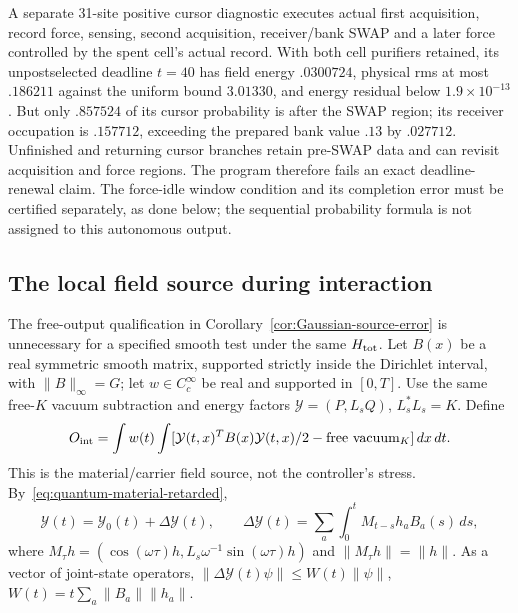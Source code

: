 A separate 31-site positive cursor diagnostic executes actual first
acquisition, record force, sensing, second acquisition, receiver/bank
SWAP and a later force controlled by the spent cell's actual record.
With both cell purifiers retained, its unpostselected deadline $t=40$
has field energy $.0300724$, physical rms at most $.186211$ against
the uniform bound $3.01330$, and energy residual below
$1.9\times10^{-13}$. But only $.857524$ of its cursor probability
is after the SWAP region; its receiver occupation is $.157712$, exceeding
the prepared bank value $.13$ by $.027712$. Unfinished and returning cursor branches
retain pre-SWAP data and can revisit acquisition and force regions.
The program therefore fails an exact deadline-renewal claim.
The force-idle window condition and its completion error must be
certified separately, as done below; the sequential probability formula
is not assigned to this autonomous output.

\subsection{The local field source during interaction}
\label{sec:interacting-material-source}

The free-output qualification in
Corollary~\ref{cor:Gaussian-source-error} is unnecessary for a
specified smooth test under the same $H_{\rm tot}$.
Let $B(x)$ be a real symmetric smooth matrix, supported strictly inside
the Dirichlet interval, with $\|B\|_\infty=G$; let
$w\in C_c^\infty$ be real and supported in $[0,T]$.
Use the same free-$K$ vacuum subtraction and energy factors
$\mathcal Y=(P,L_sQ)$, $L_s^*L_s=K$. Define
\[
 O_{\rm int}=\int w(t)\int
  [\mathcal Y(t,x)^TB(x)\mathcal Y(t,x)/2-
           \text{free vacuum}_K]\,dx\,dt .
\]
This is the material/carrier field source, not the controller's stress.
By~\eqref{eq:quantum-material-retarded},
\[
 \mathcal Y(t)=\mathcal Y_0(t)+\Delta\mathcal Y(t),\qquad
 \Delta\mathcal Y(t)=\sum_a\int_0^t
       M_{t-s}h_a B_a(s)\,ds ,
\]
where $M_\tau h=(\cos(\omega\tau)h,L_s\omega^{-1}
\sin(\omega\tau)h)$ and $\|M_\tau h\|=\|h\|$.
As a vector of joint-state operators,
$\|\Delta\mathcal Y(t)\psi\|\le W(t)\|\psi\|$,
$W(t)=t\sum_a\|B_a\|\|h_a\|$.

